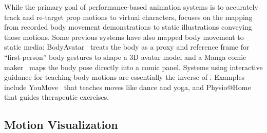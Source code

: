 While the primary goal of performance-based animation systems is to accurately track and re-target prop motions to virtual characters, \systemname{} focuses on the mapping from recorded body movement demonstrations to static illustrations conveying those motions.
Some previous systems have also mapped body movement to static media:
BodyAvatar~\cite{Zhang:2013:BodyAvatar} treats the body as a proxy and reference frame for ``first-person'' body gestures to shape a 3D avatar model and
a Manga comic maker~\cite{lumb_manga_2013} maps the body pose directly into a comic panel.
Systems using interactive guidance for teaching body motions are essentially the inverse of \systemname{}. Examples include YouMove~\cite{anderson2013youmove} that teaches moves like dance and yoga, and Physio@Home~\cite{Tang:2014:Physio@Home} that guides therapeutic exercises.
%
%





\subsection{Motion Visualization}


